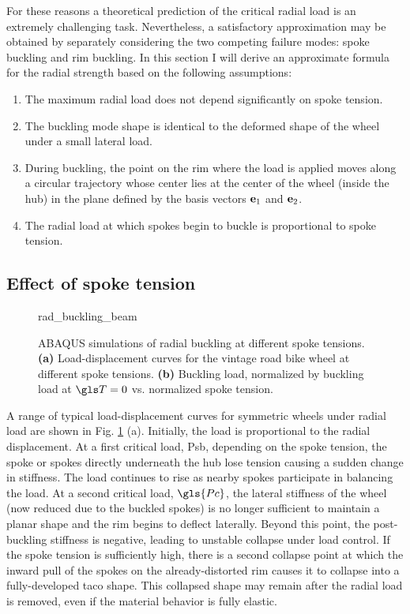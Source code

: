 \documentclass[\rootdir/thesis.tex]{subfiles}
\begin{document}
For these reasons a theoretical prediction of the critical radial load is an extremely challenging task. Nevertheless, a satisfactory approximation may be obtained by separately considering the two competing failure modes: spoke buckling and rim buckling. In this section I will derive an approximate formula \cite{Ford2017} for the radial strength based on the following assumptions:

\begin{enumerate}
\item{The maximum radial load does not depend significantly on spoke tension.}\label{assum:no_T_effect}
\item{The buckling mode shape is identical to the deformed shape of the wheel under a small lateral load.}\label{assum:lat_shape}
\item{During buckling, the point on the rim where the load is applied moves along a circular trajectory whose center lies at the center of the wheel (inside the hub) in the plane defined by the basis vectors $\mathbf{e}_1$ and $\mathbf{e}_2$.}\label{assum:circ_path}
\item{The radial load at which spokes begin to buckle is proportional to spoke tension.}\label{assum:Psb_T}
\end{enumerate}

\subsection{Effect of spoke tension}

\begin{figure}[t]
\centering
{rad_buckling_beam}
\caption[Buckling under radial force]{ABAQUS simulations of radial buckling at different spoke tensions. \textbf{(a)} Load-displacement curves for the vintage road bike wheel at different spoke tensions. \textbf{(b)} Buckling load, normalized by buckling load at $\T=0$ vs. normalized spoke tension.}
\label{fig:rad_buckling_beam}
\end{figure}

A range of typical load-displacement curves for symmetric wheels under radial load are shown in Fig. \ref{fig:rad_buckling_beam} (a). Initially, the load is proportional to the radial displacement. At a first critical load, \gls{Psb}, depending on the spoke tension, the spoke or spokes directly underneath the hub lose tension causing a sudden change in stiffness. The load continues to rise as nearby spokes participate in balancing the load. At a second critical load, $\gls{Pc}$, the lateral stiffness of the wheel (now reduced due to the buckled spokes) is no longer sufficient to maintain a planar shape and the rim begins to deflect laterally. Beyond this point, the post-buckling stiffness is negative, leading to unstable collapse under load control. If the spoke tension is sufficiently high, there is a second collapse point at which the inward pull of the spokes on the already-distorted rim causes it to collapse into a fully-developed taco shape. This collapsed shape may remain after the radial load is removed, even if the material behavior is fully elastic.
\end{document}
